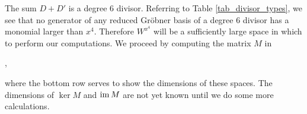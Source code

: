 The sum $D + D'$ is a degree 6 divisor. Referring to Table \ref{tab_divisor_types},
we see that no generator of any reduced Gr\"obner basis of a degree 6 divisor has a monomial larger than $x^4$.
Therefore $W^{x^4}$ will be a sufficiently large space in which to perform our computations.
We proceed by computing the matrix $M$ in
\begin{center}
  ,
\end{center}
where the bottom row serves to show the dimensions of these spaces.
The dimensions of $\ker M$ and $\operatorname{im} M$ are not yet known until we do some more calculations.

